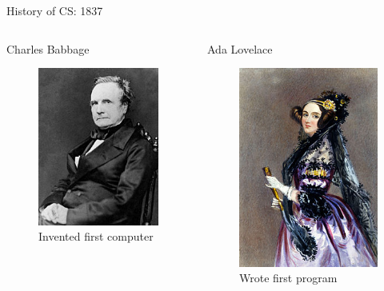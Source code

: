 \documentclass[xcolor={dvipsnames}]{beamer}
\begin{document}
\begin{frame}{History of CS: 1837}
	\begin{columns}
	 \begin{column}{.49\textwidth}
		\begin{center}Charles Babbage\end{center}
		\begin{figure}
		\includegraphics[scale=0.5]{Charles_Babbage}
		\caption{Invented first computer}
		\end{figure}
 	\end{column}
	 \begin{column}{.49\textwidth}
		\begin{center}Ada Lovelace\end{center}
  		\begin{figure}
 		\includegraphics[scale=.60]{Ada_Lovelace_portrait}
		\caption{Wrote first program}
		\end{figure}
	\end{column}
\end{columns}
\end{frame}
\end{document}

